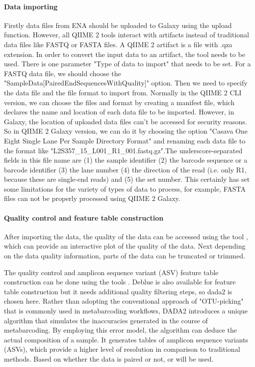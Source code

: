         \paragraph*{Data importing}
            Firstly data files from ENA should be uploaded to Galaxy using the upload function. However, all QIIME 2 tools interact with artifacts instead of traditional data files like FASTQ or FASTA files. A QIIME 2 artifact is a file with .qza extension. In order to convert the input data to an artifact, the tool  needs to be used. There is one parameter "Type of data to import" that needs to be set. For a FASTQ data file, we should choose the "SampleData[PairedEndSequencesWithQuality]" option. Then we need to specify the data file and the file format to import from. Normally in the QIIME 2 CLI version, we can choose the files and format by creating a manifest file, which declares the name and location of each data file to be imported. However, in Galaxy, the location of uploaded data files can't be accessed for security reasons. So in QIIME 2 Galaxy version, we can do it by choosing the option "Casava One Eight Single Lane Per Sample Directory Format" and renaming each data file to the format like "L2S357\_15\_L001\_R1\_001.fastq.gz".The underscore-separated fields in this file name are (1) the sample identifier (2) the barcode sequence or a barcode identifier (3) the lane number (4) the direction of the read (i.e. only R1, because these are single-end reads) and (5) the set number. This certainly has set some limitations for the variety of types of data to process, for example, FASTA files can not be properly processed using QIIME 2 Galaxy.


        \paragraph*{Quality control and feature table construction}

            After importing the data, the quality of the data can be accessed using the tool , which can provide an interactive plot of the quality of the data. Next depending on the data quality information, parts of the data can be truncated or trimmed. 

            The quality control and amplicon sequence variant (ASV) feature table construction can be done using the tools . Deblue is also available for feature table construction but it needs additional quality filtering steps, so dada2 is chosen here. Rather than adopting the conventional approach of "OTU-picking" that is commonly used in metabarcoding workflows, DADA2 \cite{callahan2016dada2} introduces a unique algorithm that simulates the inaccuracies generated in the course of metabarcoding. By employing this error model, the algorithm can deduce the actual composition of a sample. It generates tables of amplicon sequence variants (ASVs), which provide a higher level of resolution in comparison to traditional methods. Based on whether the data is paired or not,   or  will be used.
            
